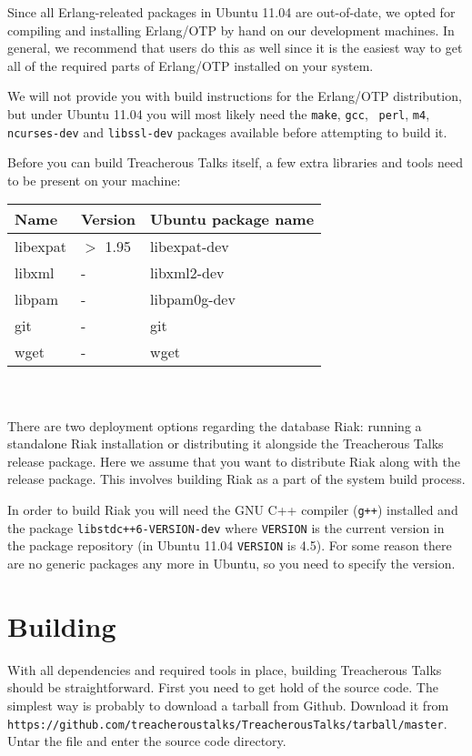 \documentclass[11pt,a4paper]{report}
\begin{document}
Since all Erlang-releated packages in Ubuntu 11.04 are out-of-date, we opted for
compiling and installing Erlang/OTP by hand on our development machines. In
general, we recommend that users do this as well since it is the easiest way to
get all of the required parts of Erlang/OTP installed on your system.

We will not provide you with build instructions for the Erlang/OTP distribution,
but under Ubuntu 11.04 you will most likely need the {\tt make}, {\tt gcc}, {\tt
  perl}, {\tt m4}, {\tt ncurses-dev} and {\tt libssl-dev} packages available
before attempting to build it.

Before you can build Treacherous Talks itself, a few extra libraries and tools
need to be present on your machine: \\

\begin{tabular}{lll}
  Name & Version & Ubuntu package name \\ \hline
  libexpat & $>$ 1.95 & libexpat-dev \\
  libxml   & -        & libxml2-dev \\
  libpam   & -        & libpam0g-dev \\
  git      & -        & git \\
  wget     & -        & wget \\
\end{tabular} \\
\\
There are two deployment options regarding the database Riak: running a
standalone Riak installation or distributing it alongside the Treacherous Talks
release package. Here we assume that you want to distribute Riak along with the
release package. This involves building Riak as a part of the system build
process.

In order to build Riak you will need the GNU C++ compiler ({\tt g++}) installed
and the package {\tt libstdc++6-VERSION-dev} where {\tt VERSION} is the current
version in the package repository (in Ubuntu 11.04 {\tt VERSION} is 4.5). For
some reason there are no generic packages any more in Ubuntu, so you need to
specify the version.
\section{Building}
With all dependencies and required tools in place, building Treacherous Talks
should be straightforward. First you need to get hold of the source code. The
simplest way is probably to download a tarball from Github. Download it from {\tt
  https://github.com/treacheroustalks/Treacherous\-Talks/tarball/master}.  Untar
the file and enter the source code directory.
\end{document}
